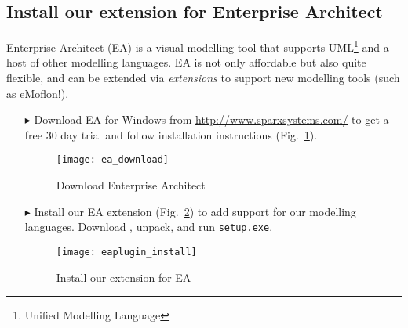 \newpage

\visHeader
\subsection{Install our extension for Enterprise Architect}

Enterprise Architect (EA) is a visual modelling tool that supports UML\footnote{Unified Modelling Language} and a host of other modelling languages.
EA is not only affordable but also quite flexible, and can be extended via \emph{extensions} to support new modelling tools (such as eMoflon!).

\begin{itemize}
\item[$\blacktriangleright$] Download\hypertarget{installEA vis}{} EA for Windows from \url{http://www.sparxsystems.com/} to get a free 30 day trial and follow
installation instructions (Fig.~\ref{enterpriseArchitextHomepage}).

\begin{figure}[htbp]
	\centering
  	\texttt{[image: ea\_download]}
	\caption{Download Enterprise Architect}
	\label{enterpriseArchitextHomepage}
\end{figure} 

\item[$\blacktriangleright$] Install our EA extension (Fig.~\ref{eaPluginWizard}) to add support for our modelling languages.
Download \EAExtensionLink, unpack, and run \texttt{setup.exe}.

\begin{figure}[htbp]
	\centering
  \texttt{[image: eaplugin\_install]}
	\caption{Install our extension for EA}
	\label{eaPluginWizard}
\end{figure}
\end{itemize}